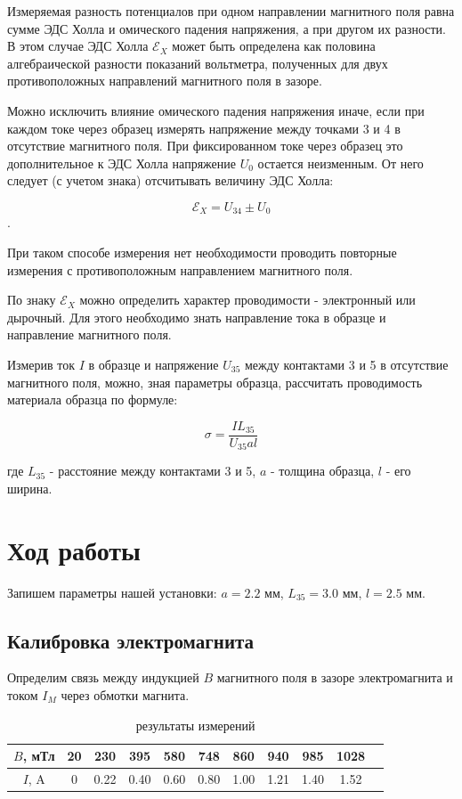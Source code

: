 \documentclass[a4paper,14pt]{article}
\begin{document}
Измеряемая разность потенциалов при одном направлении
магнитного поля равна сумме ЭДС Холла и омического падения напряжения, а
при другом  их разности. В этом случае ЭДС Холла $\mathscr{E}_{X}$ может быть определена как половина алгебраической разности показаний вольтметра, полученных для
двух противоположных направлений магнитного поля в зазоре.

Можно исключить влияние омического падения напряжения иначе, если при каждом токе через образец измерять напряжение между точками 3 и 4 в отсутствие магнитного поля. При фиксированном токе через образец это дополнительное к ЭДС Холла напряжение $U_{0}$ остается неизменным. От него следует (с учетом
знака) отсчитывать величину ЭДС Холла: 

$$\mathscr{E}_{X} = U_{34} \pm U_{0}$$. 

При таком способе измерения нет необходимости проводить повторные измерения с противоположным направлением магнитного поля.


По знаку $\mathscr{E}_{X}$ можно определить характер проводимости - электронный или дырочный. Для этого необходимо знать направление тока в образце и направление
магнитного поля.

Измерив ток $I$ в образце и напряжение $U_{35}$ между контактами 3 и 5 в отсутствие магнитного поля, можно, зная параметры образца, рассчитать проводимость материала образца по формуле:

\begin{equation}
\sigma=\dfrac{IL_{35}}{U_{35}al}
\label{sigma}
\end{equation}

где $L_{35}$ - расстояние между контактами 3 и 5, $a$ - толщина образца, $l$ - его ширина.

\section*{Ход работы}

Запишем параметры нашей установки: 
$a = 2.2$ мм,
$L_{35} = 3.0$ мм,
$l = 2.5$ мм.

\subsection*{Калибровка электромагнита}

Определим связь между индукцией $B$ магнитного поля в зазоре электромагнита и током $I_M$ через обмотки магнита.


\begin{table}[h!]
	\centering
	\begin{tabular}{|c|c|c|c|c|c|c|c|c|c|c|}
		\hline
		$B$, мТл &20&230&395&580&748&860&940&985&1028 \\ \hline
		$I$, A
		&0	&
		0.22	&
		0.40	&
		0.60	&
		0.80	&
		1.00	&
		1.21	&
		1.40	&
		1.52	\\ \hline
	\end{tabular}
	\caption{результаты измерений}
	\label{tab1}
\end{table}
\end{document}

